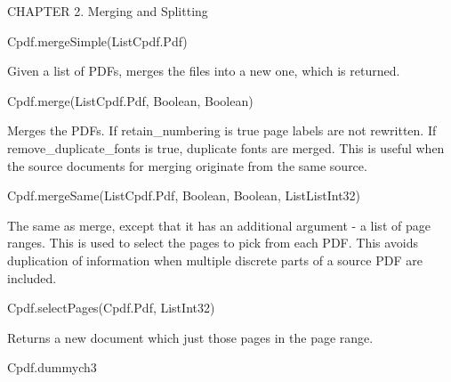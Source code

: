 CHAPTER 2. Merging and Splitting

Cpdf.mergeSimple(List{Cpdf.Pdf})


Given a list of PDFs, 
merges the files into a new one, which is returned.


Cpdf.merge(List{Cpdf.Pdf}, Boolean, Boolean)


Merges the
PDFs. If retain_numbering is true page labels are not rewritten. If
remove_duplicate_fonts is true, duplicate fonts are merged. This is useful
when the source documents for merging originate from the same source.


Cpdf.mergeSame(List{Cpdf.Pdf}, Boolean, Boolean, List{List{Int32}})


The same as merge, except that it has an additional
argument - a list of page ranges. This is used to select the pages to
pick from each PDF. This avoids duplication of information when multiple
discrete parts of a source PDF are included.


Cpdf.selectPages(Cpdf.Pdf, List{Int32})


Returns a new document which just those pages
in the page range.


Cpdf.dummych3

